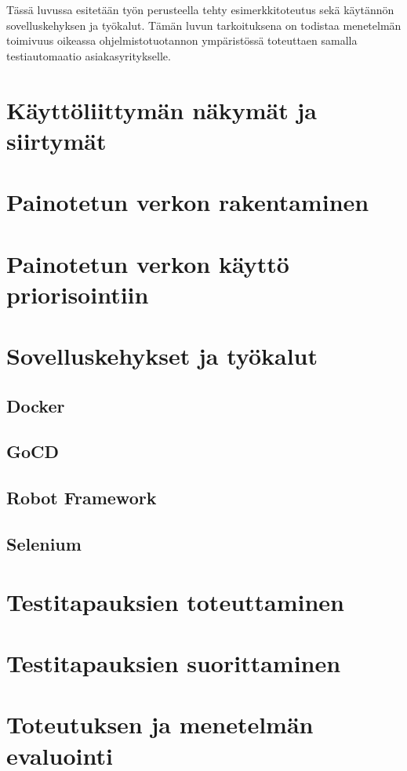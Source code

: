 Tässä luvussa esitetään työn perusteella tehty esimerkkitoteutus sekä käytännön sovelluskehyksen ja työkalut.
Tämän luvun tarkoituksena on todistaa menetelmän toimivuus oikeassa ohjelmistotuotannon ympäristössä toteuttaen samalla testiautomaatio asiakasyritykselle.

\section{Käyttöliittymän näkymät ja siirtymät}


\section{Painotetun verkon rakentaminen}


\section{Painotetun verkon käyttö priorisointiin}


\section{Sovelluskehykset ja työkalut}


  \subsection{Docker}


  \subsection{GoCD}


  \subsection{Robot Framework}


  \subsection{Selenium}


\section{Testitapauksien toteuttaminen}


\section{Testitapauksien suorittaminen}


\section{Toteutuksen ja menetelmän evaluointi}


